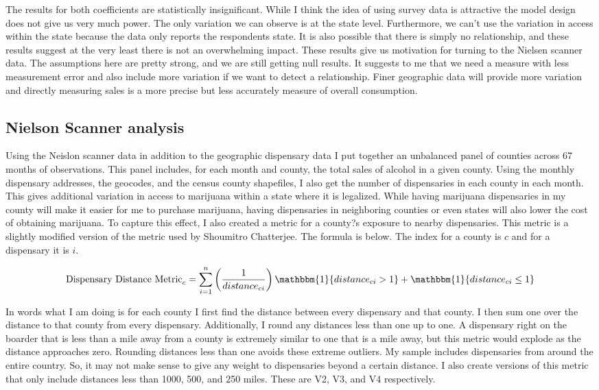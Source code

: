 \documentclass[11pt]{article}
\begin{document}
The results for both coefficients are statistically insignificant. While I think the idea of using survey data is attractive the model design does not give us very much power. The only variation we can observe is at the state level. Furthermore, we can't use the variation in access within the state because the data only reports the respondents state. It is also possible that there is simply no relationship, and these results suggest at the very least there is not an overwhelming impact. These results give us motivation for turning to the Nielsen scanner data.  The assumptions here are pretty strong, and we are still getting null results. It suggests to me that we need a measure with less measurement error and also include more variation if we want to detect a relationship. Finer geographic data will provide more variation and directly measuring sales is a more precise but less accurately measure of overall consumption. 


\subsection{Nielson Scanner analysis}

Using the Neislon scanner data in addition to the geographic dispensary data I put together an unbalanced panel of counties across 67 months of observations. This panel includes, for each month and county, the total sales of alcohol in a given county. Using the monthly dispensary addresses, the geocodes, and the census county shapefiles, I also get the number of dispensaries in each county in each month. This gives additional variation in access to marijuana within a state where it is legalized. While having marijuana dispensaries in my county will make it easier for me to purchase marijuana, having dispensaries in neighboring counties or even states will also lower the cost of obtaining marijuana. To capture this effect, I also created a metric for a county?s exposure to nearby dispensaries. This metric is a slightly modified version of the metric used by Shoumitro Chatterjee. \cite{Shoumitro} The formula is below. The index for a county is $c$ and for a dispensary it is $i$.

$$ \text{Dispensary Distance Metric}_c = \sum_{i=1}^{n} \left( \frac{1}{distance_{ci}}\right)\mathbbm{1} \{distance_{ci} > 1 \} + \mathbbm{1}\{distance_{ci} \le 1 \} 
$$

In words what I am doing is for each county I first find the distance between every dispensary and that county. I then sum one over the distance to that county from every dispensary. Additionally, I round any distances less than one up to one. A dispensary right on the boarder that is less than a mile away from a county is extremely similar to one that is a mile away, but this metric would explode as the distance approaches zero. Rounding distances less than one avoids these extreme outliers. My sample includes dispensaries from around the entire country. So, it may not make sense to give any weight to dispensaries beyond a certain distance. I also create versions of this metric that only include distances less than 1000, 500, and 250 miles. These are V2, V3, and V4 respectively. \par 
\end{document}
